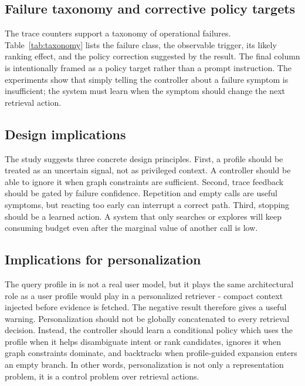 \subsection{Failure taxonomy and corrective policy targets}
The trace counters support a taxonomy of operational failures. Table~\ref{tab:taxonomy} lists the failure class, the observable trigger, its likely ranking effect, and the policy correction suggested by the result. The final column is intentionally framed as a policy target rather than a prompt instruction. The experiments show that simply telling the controller about a failure symptom is insufficient; the system must learn when the symptom should change the next retrieval action.



\subsection{Design implications}
The study suggests three concrete design principles. First, a profile should be treated as an uncertain signal, not as privileged context. A controller should be able to ignore it when graph constraints are sufficient. Second, trace feedback should be gated by failure confidence. Repetition and empty calls are useful symptoms, but reacting too early can interrupt a correct path. Third, stopping should be a learned action. A system that only searches or explores will keep consuming budget even after the marginal value of another call is low.



\subsection{Implications for personalization}
The query profile in \tb is not a real user model, but it plays the same architectural role as a user profile would play in a personalized retriever - compact context injected before evidence is fetched. The negative result therefore gives a useful warning. Personalization should not be globally concatenated to every retrieval decision. Instead, the controller should learn a conditional policy which uses the profile when it helps disambiguate intent or rank candidates, ignores it when graph constraints dominate, and backtracks when profile-guided expansion enters an empty branch. In other words, personalization is not only a representation problem, it is a control problem over retrieval actions.
